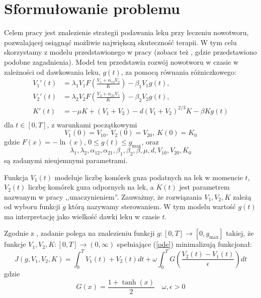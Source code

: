 \documentclass[licencjacka]{pracamgr}
\begin{document}
\chapter{Sformułowanie problemu}
Celem pracy jest znalezienie strategii podawania leku przy leczeniu nowotworu, pozwalającej osiągnąć możliwie największą skuteczność terapii. W tym celu skorzystamy z modelu przedstawionego w pracy \cite{BBF-manuscript} (zobacz też \cite{BBF2016}, \cite{BBF2019} gdzie przedstawiono podobne zagadnienia). Model ten przedstawia rozwój nowotworu w czasie w zależności od dawkowania leku, $g(t)$, za pomocą równania różniczkowego:
\begin{equation} \label{ode}
  \begin{aligned} 
    V_1'(t) &= \lambda_1V_1F\left(\frac{V_1 + \alpha_{12}V_2}{K}\right) - \beta_1V_1g(t), \\
    V_2'(t) &= \lambda_2V_2F\left(\frac{V_2 + \alpha_{21}V_1}{K}\right) - \beta_2V_2g(t), \\
    K'(t) &= -\mu K + (V_1+V_2) - d{(V_1 + V_2)}^{2/3}K - \beta K g(t) \\
  \end{aligned}
\end{equation}
dla $t \in [0, T]$, z warunkami początkowymi
\begin{equation} \label{ode-start}
   V_1(0) = V_{10},\ V_2(0) = V_{20},\ K(0) = K_0
\end{equation}
gdzie $F(x) = -\ln(x)$, $ 0 \le g(t) \le g_{\max}$, oraz
\[\lambda_1, \lambda_2, \alpha_{12}, \alpha_{21}, \beta_1, \beta_2, \beta, \mu, d, V_{10}, V_{20}, K_0 \]
są zadanymi nieujemnymi parametrami.

Funkcja $V_1(t)$ modeluje liczbę komórek guza podatnych na lek w momencie $t$, $V_2(t)$ liczbę komórek guza odpornych na lek, a $K(t)$ jest parametrem nazwanym w pracy ,,unaczynieniem''. Zauważmy, że rozwiązania $V_1, V_2, K$ zależą od wyboru funkcji $g$ którą nazywamy sterowaniem. W tym modelu wartość $g(t)$ ma interpretację jako wielkość dawki leku w czasie $t$.

Zgodnie z \cite{BBF-manuscript}, zadanie polega na znalezieniu funkcji $g: [0, T] \to [0, g_{\max}]$ takiej, że funkcje $V_1, V_2, K: [0, T] \to (0, \infty)$ spełniające (\ref{ode}) minimalizują funkcjonał:
\begin{equation} \label{objf}
  J(g, V_1, V_2, K) = \int_0^T V_1(t) + V_2(t)dt + \omega\int_0^T G\left(\frac{V_2(t) - V_1(t)}{\epsilon}\right) dt
\end{equation}
gdzie
\begin{equation*}
  G(x) = \frac{1+\tanh(x)}{2} \quad
  \omega, \epsilon > 0 
\end{equation*}
\end{document}
